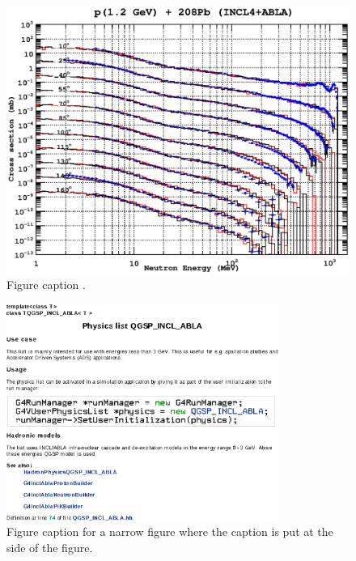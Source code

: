 \documentclass[a4paper]{jpconf}
\begin{document}
\begin{figure}[h]

\begin{center}
\includegraphics[width=30pc]{poster/images/lead.eps}
\end{center}
\caption{\label{label}Figure caption .}
\end{figure}

\begin{figure}[h]
\includegraphics[width=21pc]{poster/images/inclAblaDoc.eps}\hspace{2pc}%
\begin{minipage}[b]{14pc}\caption{\label{label}Figure caption for a narrow figure where the caption is put at the side of the figure.}
\end{minipage}
\end{figure}
\end{document}
